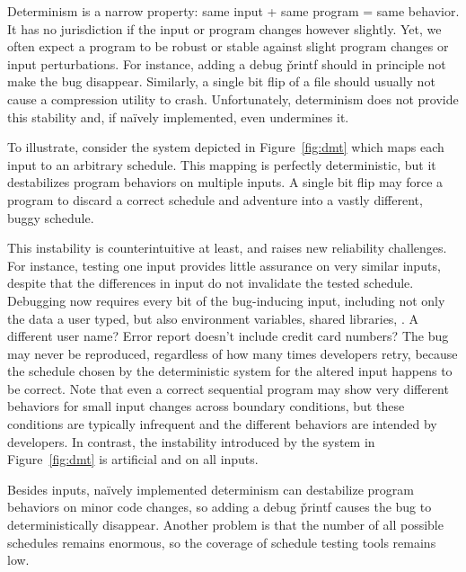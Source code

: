  Determinism is a
narrow property: same input + same program = same behavior. It has no
jurisdiction if the input or program changes however slightly.  Yet, we
often expect a program to be robust or stable against slight program
changes or input perturbations.  For instance, adding a debug \v{printf}
should in principle not make the bug
disappear.  Similarly, a single bit flip of a file should usually not
cause a compression utility to crash. Unfortunately, determinism
does not provide this stability and, if na\"{i}vely implemented,
even undermines it.

To illustrate, consider the system depicted in
Figure~\ref{fig:dmt} which maps each input to an arbitrary schedule. This
mapping is perfectly deterministic, but it destabilizes program
behaviors on multiple inputs.  A single bit flip may force a program to
discard a correct schedule and adventure into a vastly different, buggy
schedule.

This instability is counterintuitive at least,
and raises new reliability challenges.  For instance, testing one input
provides little assurance on very similar inputs, despite that the differences
in input do not invalidate the tested schedule.  Debugging now requires
every bit of the bug-inducing input, including not only the data a user
typed, but also environment variables, shared libraries, \etc.  A
different user name?  Error report doesn't include credit card numbers?
The bug may never be reproduced, regardless of how many times developers
retry, because the schedule chosen by the deterministic system for the
altered input happens to be correct.  Note that even a correct
sequential program may show very different behaviors for small input
changes across boundary conditions, but these conditions are typically
infrequent and the different behaviors are intended by developers.  In
contrast, the instability introduced by the system in Figure~\ref{fig:dmt}
is artificial and on all inputs.

Besides inputs, na\"{i}vely implemented determinism can destabilize
program behaviors on minor code changes, so adding a debug \v{printf}
causes the bug to deterministically disappear.  Another problem is that
the number of all possible schedules remains enormous, so the coverage of
schedule testing tools remains low.

